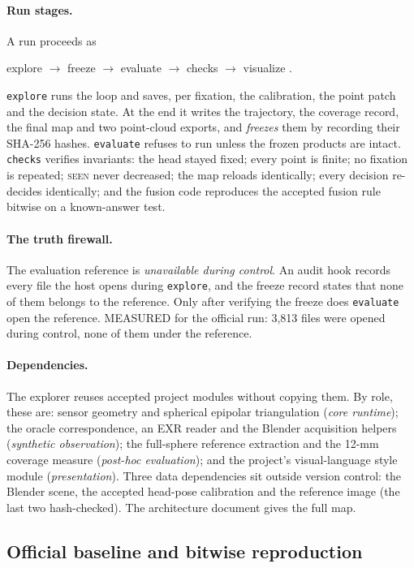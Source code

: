 \documentclass[11pt,a4paper]{article}
\newcommand{\code}[1]{\texttt{\small #1}}
\begin{document}
\paragraph{Run stages.} A run proceeds as
\begin{center}
\sffamily explore $\rightarrow$ freeze $\rightarrow$ evaluate $\rightarrow$ checks $\rightarrow$ visualize .
\end{center}
\code{explore} runs the loop and saves, per fixation, the calibration, the point patch and the decision state. At the
end it writes the trajectory, the coverage record, the final map and two point-cloud exports, and \emph{freezes} them
by recording their SHA-256 hashes. \code{evaluate} refuses to run unless the frozen products are intact.
\code{checks} verifies invariants: the head stayed fixed; every point is finite; no fixation is repeated;
\textsc{seen} never decreased; the map reloads identically; every decision re-decides identically; and the fusion code
reproduces the accepted fusion rule bitwise on a known-answer test.

\paragraph{The truth firewall.} The evaluation reference is \emph{unavailable during control}. An audit hook records
every file the host opens during \code{explore}, and the freeze record states that none of them belongs to the
reference. Only after verifying the freeze does \code{evaluate} open the reference. MEASURED for the official run:
3{,}813 files were opened during control, none of them under the reference.

\paragraph{Dependencies.} The explorer reuses accepted project modules without copying them. By role, these are:
sensor geometry and spherical epipolar triangulation (\emph{core runtime}); the oracle correspondence, an EXR reader
and the Blender acquisition helpers (\emph{synthetic observation}); the full-sphere reference extraction and the 12-mm
coverage measure (\emph{post-hoc evaluation}); and the project's visual-language style module (\emph{presentation}).
Three data dependencies sit outside version control: the Blender scene, the accepted head-pose calibration and the
reference image (the last two hash-checked). The architecture document gives the full map.

\subsection{Official baseline and bitwise reproduction}\label{sec:equivalence}
\end{document}
